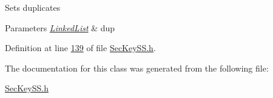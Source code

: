Sets duplicates 
\begin{DoxyParams}{Parameters}
{\em \hyperlink{classLinkedList}{Linked\+List}} & dup \\
\hline
\end{DoxyParams}


Definition at line \hyperlink{SecKeySS_8h_source_l00139}{139} of file \hyperlink{SecKeySS_8h_source}{Sec\+Key\+S\+S.\+h}.



The documentation for this class was generated from the following file\+:\begin{DoxyCompactItemize}
\item 
\hyperlink{SecKeySS_8h}{Sec\+Key\+S\+S.\+h}\end{DoxyCompactItemize}
